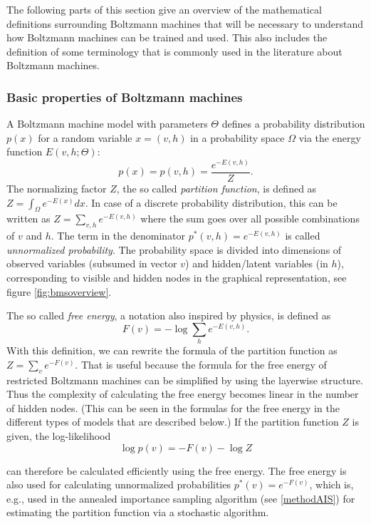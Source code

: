 \documentclass[12pt]{article}
\begin{document}
The following parts of this section give an overview of the mathematical definitions surrounding Boltzmann machines that will be necessary to understand how Boltzmann machines can be trained and used.
This also includes the definition of some terminology that is commonly used in the literature about Boltzmann machines.

\subsubsection{Basic properties of Boltzmann machines}\label{basicbmproperties}

A Boltzmann machine model with parameters $\Theta$ defines a probability distribution $p(x)$ for a random variable $x = (v, h)$ in a probability space $\Omega$ via the energy function $E(v, h; \Theta)$:
\begin{equation}
   p(x) = p(v, h) = \frac{e^{-E(v,h)}}{Z}.
   \label{eqn:probbm}
\end{equation}
The normalizing factor $Z$, the so called \emph{partition function}, is defined as $Z = \int_{\Omega} e^{-E(x)} dx$. In case of a discrete probability distribution, this can be written as $Z = \sum_{v,h}e^{-E(v,h)}$ where the sum goes over all possible combinations of $v$ and $h$.
The term in the denominator $p^*(v,h) = e^{-E(v,h)}$ is called \emph{unnormalized probability}.
The probability space is divided into dimensions of observed variables (subsumed in vector $v$) and hidden/latent variables (in $h$), corresponding to visible and hidden nodes in the graphical representation, see figure \ref{fig:bmsoverview}.

The so called \emph{free energy}, a notation also inspired by physics, is defined as
\[
   F(v) = - \log \sum_h e^{-E(v, h)}.
\]
With this definition, we can rewrite the formula of the partition function as $Z = \sum_v e^{-F(v)}$.
That is useful because the formula for the free energy of restricted Boltzmann machines can be simplified by using the layerwise structure.
Thus the complexity of calculating the free energy becomes linear in the number of hidden nodes. (This can be seen in the formulas for the free energy in the different types of models that are described below.)
If the partition function $Z$ is given, the log-likelihood
\begin{equation}
   \log p(v) = - F(v) - \log Z
\label{eqn:pRBMfreeenergy}
\end{equation}

can therefore be calculated efficiently using the free energy. The free energy is also used for calculating unnormalized probabilities $p^*(v) = e^{-F(v)}$, which is, e.g., used in the annealed importance sampling algorithm (see \ref{methodAIS}) for estimating the partition function via a stochastic algorithm.
\end{document}

